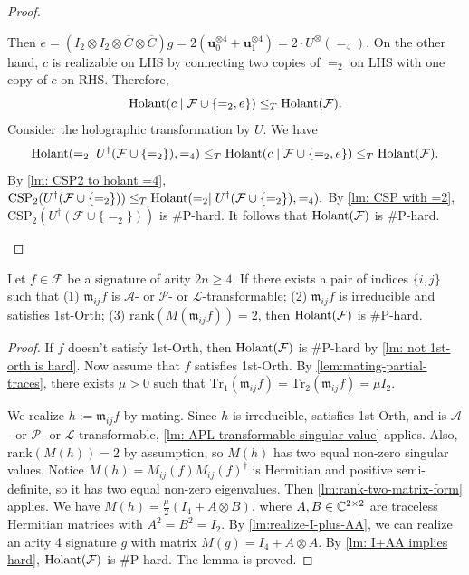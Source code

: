 \begin{proof}
\begin{itemize}
        Then $e=(I_2\otimes I_2\otimes \overline{C}\otimes\overline{C})g=2(\mathbf{u}_0^{\otimes 4}+\mathbf{u}_1^{\otimes 4})=2\cdot U^{\otimes}(=_4).$
        On the other hand, $c$ is realizable on LHS by connecting two copies of $=_2$ on LHS with one copy of $c$ on RHS.
        Therefore,
        \[
        \operatorname{Holant}(c\mid \mathcal{F}\cup\{=_2,e\})\le_T\operatorname{Holant}(\mathcal{F}).
        \]
        Consider the holographic transformation by $U$.
        We have
        \[
        \operatorname{Holant}(=_2\mid U^\dagger (\mathcal{F}\cup\{=_2\}),=_4)
        \le_T
        \operatorname{Holant}(c\mid \mathcal{F}\cup\{=_2,e\})\le_T\operatorname{Holant}(\mathcal{F}).
        \]
        By \cref{lm: CSP2 to holant =4}, $\mathrm{CSP}_2({U^\dagger}(\mathcal{F}\cup\{=_2\}))\le_T\operatorname{Holant}(=_2\mid U^\dagger (\mathcal{F}\cup\{=_2\}),=_4).$
        By \cref{lm: CSP with =2}, $\mathrm{CSP}_2({U^\dagger}(\mathcal{F}\cup\{=_2\}))$ is \#P-hard.
        It follows that $\operatorname{Holant}(\mathcal{F})$ is \#P-hard.
    \end{itemize}
    
\end{proof}

\begin{lemma}\label{lm: APL-trans rank 2}
    Let $f\in \mathcal{F}$ be a signature of arity $2n\ge 4$.
    If there exists a pair of indices $\{i,j\}$ such that (1) $\mathfrak{m}_{ij}f$ is $\mathscr{A}$- or $\mathscr{P}$- or $\mathscr{L}$-transformable; (2) $\mathfrak{m}_{ij}f$ is irreducible and satisfies {\sc 1st-Orth}; (3) $\mathrm{rank}(M(\mathfrak{m}_{ij}f))=2$, then $\operatorname{Holant}(\mathcal{F})$ is \#P-hard.
\end{lemma}
\begin{proof}
    If $f$ doesn't satisfy {\sc 1st-Orth}, then $\operatorname{Holant}(\mathcal{F})$ is \#P-hard by \cref{lm: not 1st-orth is hard}.
    Now assume that $f$ satisfies {\sc 1st-Orth}.
    By \cref{lem:mating-partial-traces}, there exists $\mu>0$ such that $\mathrm{Tr}_1(\mathfrak{m}_{ij}f)=\mathrm{Tr}_2(\mathfrak{m}_{ij}f)=\mu I_2.$
    
    We realize $h:=\mathfrak{m}_{ij}f$ by mating.
    Since $h$ is irreducible, satisfies {\sc 1st-Orth}, and is $\mathscr{A}$- or $\mathscr{P}$- or $\mathscr{L}$-transformable, 
    \cref{lm: APL-transformable singular value} applies.
    Also, $\mathrm{rank}(M(h))=2$ by assumption, so $M(h)$ has two equal non-zero singular values.
    Notice $M(h)=M_{ij}(f)M_{ij}(f)^\dagger$ is Hermitian and positive semi-definite, so it has two equal non-zero eigenvalues.
    Then \cref{lm:rank-two-matrix-form} applies.
    We have $M(h)=\frac{\mu}{2}(I_4+A\otimes B)$, where $A,B\in \mathbb{C}^{2\times 2}$ are traceless Hermitian matrices with $A^2=B^2=I_2.$
    By \cref{lm:realize-I-plus-AA}, we can realize an arity 4 signature $g$ with matrix $M(g)=I_4+A\otimes A.$
    By \cref{lm: I+AA implies hard}, $\operatorname{Holant}(\mathcal{F})$ is \#P-hard.
    The lemma is proved.
\end{proof}

